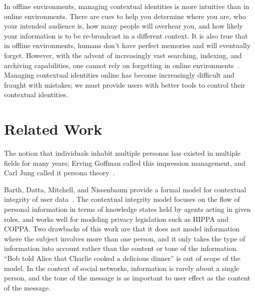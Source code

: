 \documentclass[10pt, conference, compsocconf]{IEEEtran}
\begin{document}
\begin{comment}
zuckerberg on "having multiple identities is dishonest"
http://books.google.ca/books?id=RRUkLhyGZVgC&pg=PA199&lpg=PA199&dq=%
\end{comment}

In offline environments, managing contextual identities is more intuitive than
in online environments. There are cues to help you determine where you are,
who your intended audience is, how many people will overhear you, and how
likely your information is to be re-broadcast in a different context. It is
also true that in offline environments, humans don't have perfect memories and
will eventually forget.  However, with the advent of increasingly vast
searching, indexing, and archiving capabilities, one cannot rely on forgetting
in online environments~\cite{delete}. Managing contextual identities
online has become increasingly difficult and fraught with mistakes; we must
provide users with better tools to control their contextual identities.

\section{Related Work}

The notion that individuals inhabit multiple personas has existed in multiple
fields for many years; Erving Goffman called this impression management, and
Carl Jung called it persona theory~\cite{goffman,jung}.

Barth, Datta, Mitchell, and Nissenbaum provide a formal model for contextual
integrity of user data~\cite{barth}. The contextual integrity model focuses on
the flow of personal information in terms of knowledge states held by agents
acting in given roles, and works well for modeling privacy legislation such as
HIPPA and COPPA. Two drawbacks of this work are that it does not
model information where the subject involves more than one person, and it
only takes the type of information into account rather than the content or tone
of the information.  ``Bob told Alice that Charlie cooked a
delicious dinner'' is out of scope of the model.  In the context of social
networks, information is rarely about a single person, and the tone of the
message is as important to user effect as the content of the message.
\end{document}
